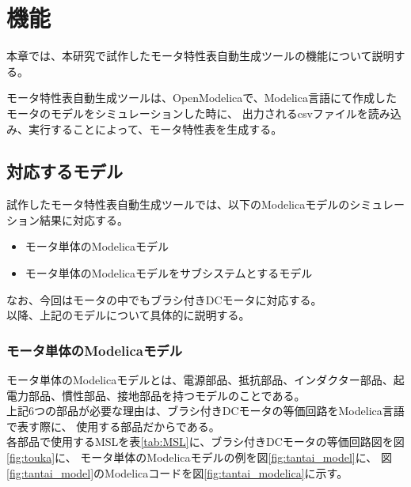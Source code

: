 \chapter{機能}\label{cha:Function}

本章では、本研究で試作したモータ特性表自動生成ツールの機能について説明する。

モータ特性表自動生成ツールは、OpenModelicaで、Modelica言語にて作成したモータのモデルをシミュレーションした時に、
出力されるcsvファイルを読み込み、実行することによって、モータ特性表を生成する。\\

\section{対応するモデル}\label{taioumodel}
試作したモータ特性表自動生成ツールでは、以下のModelicaモデルのシミュレーション結果に対応する。
\begin{itemize}
	\item モータ単体のModelicaモデル
	\item モータ単体のModelicaモデルをサブシステムとするモデル
\end{itemize}
なお、今回はモータの中でもブラシ付きDCモータに対応する。\\
以降、上記のモデルについて具体的に説明する。

\subsection{モータ単体のModelicaモデル}\label{sec:sub1}
モータ単体のModelicaモデルとは、電源部品、抵抗部品、インダクター部品、起電力部品、慣性部品、接地部品を持つモデルのことである。\\
上記6つの部品が必要な理由は、ブラシ付きDCモータの等価回路\cite{等価回路}をModelica言語で表す際に、
使用する部品\cite{modelicaシステム本}だからである。\\
各部品で使用するMSLを表\ref{tab:MSL}に、ブラシ付きDCモータの等価回路図を図\ref{fig:touka}に、
モータ単体のModelicaモデルの例を図\ref{fig:tantai_model}に、
図\ref{fig:tantai_model}のModelicaコードを図\ref{fig:tantai_modelica}に示す。


